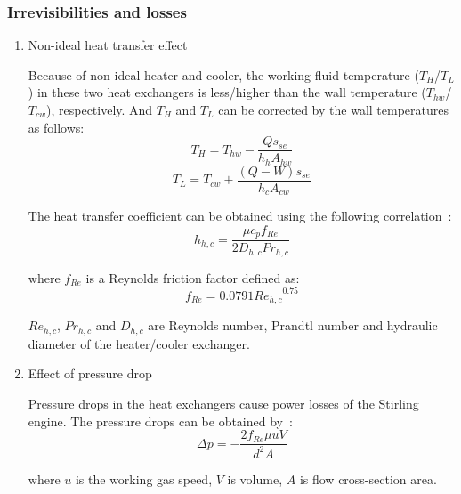 
\subsubsection{Irrevisibilities and losses}

\begin{enumerate}
\item Non-ideal heat transfer effect

Because of non-ideal heater and cooler, the working fluid temperature ($T_{H}$/$T_L$) in these two heat exchangers is less/higher than the wall temperature ($T_{hw}$/$T_{cw}$), respectively. And $T_{H}$ and $T_{L}$ can be corrected by the wall temperatures as follows:
\begin{equation}
	T_H = T_{hw} - \frac{Qs_{se}}{h_hA_{hw}}
	\label{eq:T_H}
\end{equation}
\begin{equation}
	T_L = T_{cw} + \frac{(Q-W)s_{se}}{h_cA_{cw}}
	\label{eq:T_L}
\end{equation}

The heat transfer coefficient can be obtained using the following correlation~\cite{Babaelahi2015}:
\begin{equation}
	h_{h,c} = \frac{\mu c_pf_{Re}}{2D_{h,c}Pr_{h,c}}
\end{equation}

where $f_{Re}$ is a Reynolds friction factor defined as:
\begin{equation}
	f_{Re} = 0.0791{Re_{h,c}}^{0.75}
\end{equation}

$Re_{h,c}$, $Pr_{h,c}$ and $D_{h,c}$ are Reynolds number, Prandtl number and hydraulic diameter of the heater/cooler exchanger.

\item Effect of pressure drop

Pressure drops in the heat exchangers cause power losses of the Stirling engine. The pressure drops can be obtained by~\cite{Urieli1984}:
\begin{equation}
	\Delta p = -\frac{2f_{Re}\mu u V}{d^2A}
\end{equation}

where $u$ is the working gas speed, $V$ is volume, $A$ is flow cross-section area.


\end{enumerate}
